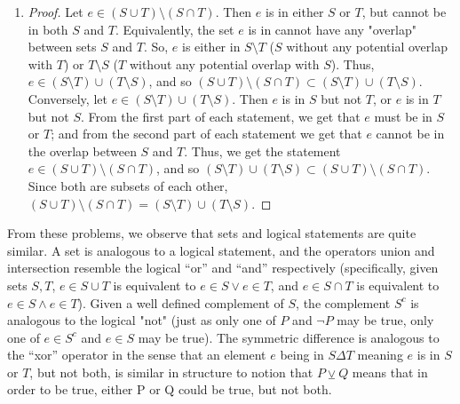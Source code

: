 \documentclass{homework}
\begin{document}
\begin{solution}
\begin{enumerate}[label=(\alph*)]
  \item 
    \begin{proof}[Proof]
      Let $e\in \left( S\cup T \right) \setminus \left( S\cap T \right) $. Then $e$ is in either
      $S$ or $T$, but cannot be in both $S$ and $T$. Equivalently, the set $e$ is in cannot have any "overlap"
      between sets $S$ and $T$. So, $e$ is either in $S\setminus T$ ($S$ without any potential
      overlap with $T$) or $T\setminus S$ ($T$ without any potential overlap with $S$). Thus, $e\in
      \left( S\setminus T \right) \cup \left( T\setminus S \right) $, and so $\left( S\cup T \right)
      \setminus \left( S\cap T \right) \subset \left( S\setminus T \right) \cup \left( T\setminus S
      \right) $.\\
      Conversely, let $e\in \left( S\setminus T \right) \cup \left( T\setminus S \right) $. Then
      $e$ is in $S$ but not $T$, or $e$ is in $T$ but not $S$. From the first part of each
      statement, we get that $e$ must be in $S$ or $T$; and from the second part of each statement 
      we get that $e$ cannot be in the overlap between $S$ and $T$. Thus, we get the statement 
      $e\in \left( S\cup T \right) \setminus \left( S\cap T\right) $, and so $\left( S\setminus 
      T \right) \cup \left( T\setminus S \right) \subset \left( S\cup T \right) \setminus \left(
    S\cap T \right) $.\\
      Since both are subsets of each other, $\left( S\cup T \right) \setminus \left( S\cap T \right)
      = \left( S\setminus T \right) \cup \left( T\setminus S \right) $.
    \end{proof}
\end{enumerate}
From these problems, we observe that sets and logical statements are quite similar. A set is
analogous to a logical statement, and the operators union and intersection resemble the logical
``or'' and ``and'' respectively (specifically, given sets $S,T$, $e\in S\cup T$ is equivalent to
$e\in S\lor e\in T$, and $e\in S\cap T$ is equivalent to $e\in S\land e\in T$). 
Given a well defined complement of $S$, the complement $S^{c}$ is analogous
to the logical "not" (just as only one of $P$ and  $\neg P$ may be true, only one of  $e\in S^{c}$
and $e\in S$ may be true). The symmetric difference is analogous to the ``xor'' operator in the sense
that an element $e$ being in $S\Delta T$ meaning $e$ is in $S$ or $T$, but not both, is similar in
structure to notion that $P\veebar Q$ means that in order to be true, either P or Q could be true,
but not both.
\end{solution}
\end{document}
